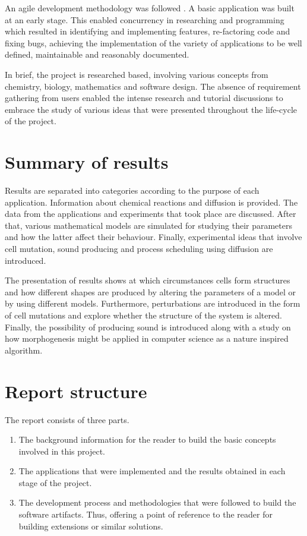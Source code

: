 An agile development methodology was followed \cite{larman_applying_2004}. A basic application was built at an early stage. This enabled concurrency in researching and programming which resulted in identifying and implementing features, re-factoring code and fixing bugs, achieving the implementation of the variety of applications to be well defined, maintainable and reasonably documented.   

In brief, the project is researched based, involving various concepts from chemistry, biology, mathematics and software design. The absence of requirement gathering from users enabled the intense research and tutorial discussions to embrace the study of various ideas that were presented throughout the life-cycle of the project. 

\section{Summary of results}

Results are separated into categories according to the purpose of each application. Information about chemical reactions and diffusion is provided. The data from the applications and experiments that took place are discussed. After that, various mathematical models are simulated for studying their parameters and how the latter affect their behaviour. Finally, experimental ideas that involve cell mutation, sound producing and process scheduling using diffusion are introduced.

The presentation of results shows at which circumstances cells form structures and how different shapes are produced by altering the parameters of a model or by using different models. Furthermore, perturbations are introduced in the form of cell mutations and explore whether the structure of the system is altered. Finally, the possibility of producing sound is introduced along with a study on how morphogenesis might be applied in computer science as a nature inspired algorithm.     		

\section{Report structure}
The report consists of three parts.
\begin{enumerate}
\item The background information for the reader to build the basic concepts involved in this project.
\item The applications that were implemented and the results obtained in each stage of the project.
\item The development process and methodologies that were followed to build the software artifacts. Thus, offering a point of reference to the reader for building extensions or similar solutions.
\end{enumerate}

